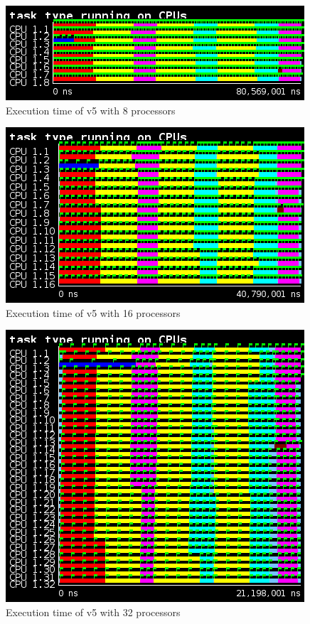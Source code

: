 \begin{figure}[H]%
    \caption{Execution time of v5 with 8 processors}%
    \label{fig:plot_v5_08}
    \centering
    \includegraphics[width=\textwidth]{./data/3dfft_/plots/v5_08.png}
\end{figure}

\begin{figure}[H]%
    \caption{Execution time of v5 with 16 processors}%
    \label{fig:plot_v5_16}
    \centering
    \includegraphics[width=\textwidth]{./data/3dfft_/plots/v5_16.png}
\end{figure}

\begin{figure}[H]%
    \caption{Execution time of v5 with 32 processors}%
    \label{fig:plot_v5_32}
    \centering
    \includegraphics[width=\textwidth]{./data/3dfft_/plots/v5_32.png}
\end{figure}

